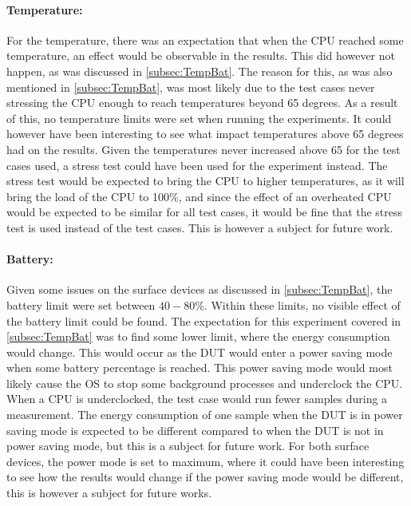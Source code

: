 \paragraph*{Temperature:} For the temperature, there was an expectation that when the CPU reached some temperature, an effect would be observable in the results. This did however not happen, as was discussed in \cref{subsec:TempBat}. The reason for this, as was also mentioned in \cref{subsec:TempBat}, was most likely due to the test cases never stressing the CPU enough to reach temperatures beyond 65 degrees. As a result of this, no temperature limits were set when running the experiments. It could however have been interesting to see what impact temperatures above 65 degrees had on the results. Given the temperatures never increased above 65 for the test cases used, a stress test could have been used for the experiment instead. The stress test would be expected to bring the CPU to higher temperatures, as it will bring the load of the CPU to 100\%, and since the effect of an overheated CPU would be expected to be similar for all test cases, it would be fine that the stress test is used instead of the test cases. This is however a subject for future work.

\paragraph*{Battery:} Given some issues on the surface devices as discussed in \cref{subsec:TempBat}, the battery limit were set between $40-80$\%. Within these limits, no visible effect of the battery limit could be found. The expectation for this experiment covered in \cref{subsec:TempBat} was to find some lower limit, where the energy consumption would change. This would occur as the DUT would enter a power saving mode when some battery percentage is reached. This power saving mode would most likely cause the OS to stop some background processes and underclock the CPU. When a CPU is underclocked, the test case would run fewer samples during a measurement. The energy consumption of one sample when the DUT is in power saving mode is expected to be different compared to when the DUT is not in power saving mode, but this is a subject for future work. For both surface devices, the power mode is set to maximum, where it could have been interesting to see how the results would change if the power saving mode would be different, this is however a subject for future works. 

